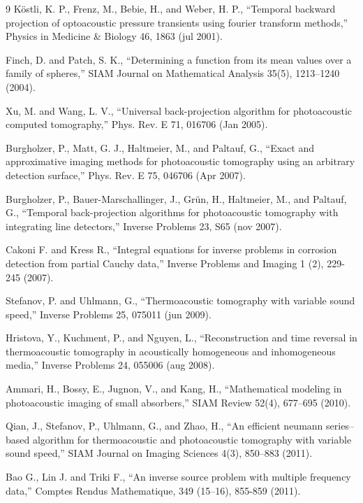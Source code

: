 \documentclass[11pt,reqno]{amsart}
\theoremstyle{remark}
\theoremstyle{italic_lemma}
\begin{document}
\begin{thebibliography}{9}
Köstli, K. P., Frenz, M., Bebie, H., and Weber, H. P., “Temporal backward projection of optoacoustic pressure
transients using fourier transform methods,” Physics in Medicine \& Biology 46, 1863 (jul 2001).

Finch, D. and Patch, S. K., “Determining a function from its mean values over a family of spheres,” SIAM
Journal on Mathematical Analysis 35(5), 1213–1240 (2004).


Xu, M. and Wang, L. V., “Universal back-projection algorithm for photoacoustic computed tomography,” Phys.
Rev. E 71, 016706 (Jan 2005).



Burgholzer, P., Matt, G. J., Haltmeier, M., and Paltauf, G., “Exact and approximative imaging methods for
photoacoustic tomography using an arbitrary detection surface,” Phys. Rev. E 75, 046706 (Apr 2007).

Burgholzer, P., Bauer-Marschallinger, J., Grün, H., Haltmeier, M., and Paltauf, G., “Temporal back-projection
algorithms for photoacoustic tomography with integrating line detectors,” Inverse Problems 23, S65 (nov 2007).

Cakoni F. and Kress R., “Integral equations for inverse problems in corrosion detection from partial Cauchy data,” Inverse Problems and Imaging 1 (2), 229-245 (2007).

Stefanov, P. and Uhlmann, G., “Thermoacoustic tomography with variable sound speed,” Inverse Problems 25,
075011 (jun 2009).


Hristova, Y., Kuchment, P., and Nguyen, L., “Reconstruction and time reversal in thermoacoustic tomography
in acoustically homogeneous and inhomogeneous media,” Inverse Problems 24, 055006 (aug 2008).


Ammari, H., Bossy, E., Jugnon, V., and Kang, H., “Mathematical modeling in photoacoustic imaging of small
absorbers,” SIAM Review 52(4), 677–695 (2010).


Qian, J., Stefanov, P., Uhlmann, G., and Zhao, H., “An efficient neumann series–based algorithm for thermoacoustic
and photoacoustic tomography with variable sound speed,” SIAM Journal on Imaging Sciences 4(3),
850–883 (2011).

Bao G., Lin J. and Triki F., “An inverse source problem with multiple frequency data,”  Comptes Rendus Mathematique,
349 (15–16), 855-859 (2011).


\end{thebibliography}
\end{document}
